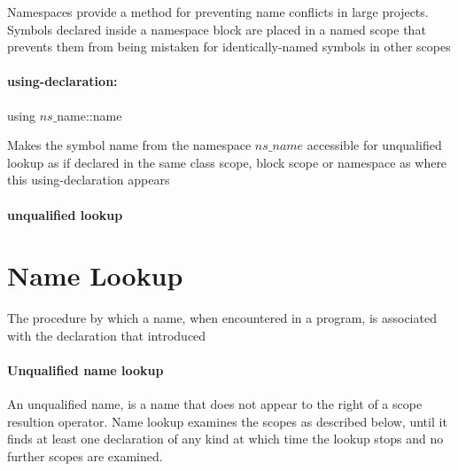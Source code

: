 \documentclass[8pt]{extreport}
\begin{document}
Namespaces provide a method for preventing name conflicts in large projects. Symbols declared inside a namespace block are placed in a named scope that prevents them from being mistaken for identically-named symbols in other scopes

\paragraph{using-declaration:} 
\begin{center}
using $ns\_$name::name
\end{center}
Makes the symbol name from the namespace $ns\_name$ accessible for unqualified lookup as if declared in the same class scope, block scope or namespace as where this using-declaration appears

\paragraph{unqualified lookup}

\section{Name Lookup}

The procedure by which a name, when encountered  in a program, is associated with the declaration that introduced


\paragraph{Unqualified name lookup} An unqualified name, is a name that does not appear to the right of a scope resultion operator. Name lookup examines the scopes as described below, until it finds at least one declaration of any kind at which time the lookup stops and no further scopes are examined.\\
\end{document}
